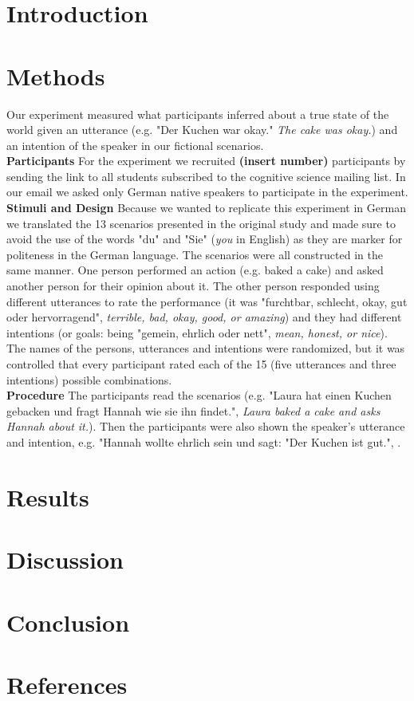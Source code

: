 \documentclass[a4paper,11pt]{article}
\title{}
\author{}
\begin{document}
\maketitle

\begin{abstract}

\end{abstract}

\section{Introduction}


\section{Methods}
Our experiment measured what participants inferred about a true state of the world given an utterance (e.g. "Der Kuchen war okay." \textit{The cake was okay.}) and an intention of the speaker in our fictional scenarios. \\
\textbf{Participants} For the experiment we recruited \textbf{(insert number)} participants by sending the link to all students subscribed to the cognitive science mailing list. In our email we asked only German native speakers to participate in the experiment.\\
\textbf{Stimuli and Design} Because we wanted to replicate this experiment in German we translated the 13 scenarios presented in the original study and made sure to avoid the use of the words "du" and "Sie" (\textit{you} in English) as they are marker for politeness in the German language. The scenarios were all constructed in the same manner. One person performed an action (e.g. baked a cake) and asked another person for their opinion about it. The other person responded using different utterances to rate the performance (it was "furchtbar, schlecht, okay, gut oder hervorragend", \textit{terrible, bad, okay, good, or amazing}) and they had different intentions (or goals: being "gemein, ehrlich oder nett", \textit{mean, honest, or nice}). The names of the persons, utterances and intentions were randomized, but it was controlled that every participant rated each of the 15 (five utterances and three intentions) possible combinations.\\
\textbf{Procedure} The participants read the scenarios (e.g. "Laura hat einen Kuchen gebacken und fragt Hannah wie sie ihn findet.", \textit{Laura baked a cake and asks Hannah about it.}). Then the participants were also shown the speaker's utterance and intention, e.g. "Hannah wollte ehrlich sein und sagt: "Der Kuchen ist gut.", .

\section{Results}

\section{Discussion}

\section{Conclusion}

\section{References}
\end{document}
